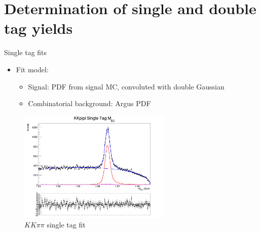 \documentclass{beamer}
\begin{document}
\section{Determination of single and double tag yields}
\begin{frame}{Single tag fits}
  \begin{itemize}
    \item{Fit model:}
    \begin{itemize}
      \item{Signal: PDF from signal MC, convoluted with double Gaussian}
      \item{Combinatorial background: Argus PDF}
    \end{itemize}
  \end{itemize}
  \begin{figure}
    \centering
    \includegraphics[width=0.65\textwidth]{Plots/KKpipi_SingleTag_MBC_Plot.png}
    \caption{$KK\pi\pi$ single tag fit}
  \end{figure}
\end{frame}
\end{document}
